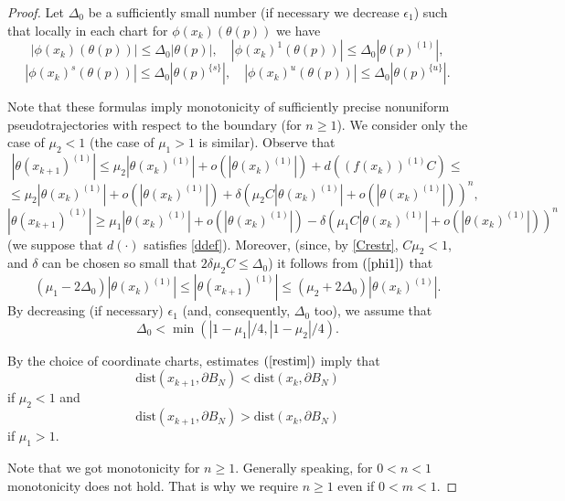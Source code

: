 \documentclass[11pt]{article}
\theoremstyle{Mystyle}
\begin{document}
\begin{proof}
Let $\Delta_0$ be a sufficiently small number (if necessary we decrease $\epsilon_1$) such that locally in each chart for $\phi(x_k)(\theta(p))$ we have
\begin{equation}
\label{phi1}
|\phi(x_k)(\theta(p))|\leq\Delta_0|\theta(p)|,\quad|\phi(x_k)^1(\theta(p))|\leq \Delta_0|\theta(p)^{(1)}|,%
\end{equation}
\begin{equation}
\label{phi2}
|\phi(x_k)^{s}(\theta(p))|\leq\Delta_0|\theta(p)^{\{s\}}|,\quad |\phi(x_k)^{u}(\theta(p))|\leq\Delta_0|\theta(p)^{\{u\}}|.
\end{equation}

Note that these formulas imply monotonicity of sufficiently precise nonuniform pseudotrajectories with respect to the boundary (for $n\geq 1$). We consider only the case of $\mu_2<1$ (the case of $\mu_1>1$ is similar).
Observe that 
$$|\theta(x_{k+1})^{(1)}|\leq \mu_2 |\theta(x_k)^{(1)}| + o(|\theta(x_k)^{(1)}|) + d((f(x_k))^{(1)}C) \leq$$ 
$$\leq\mu_2 |\theta(x_k)^{(1)}| + o(|\theta(x_k)^{(1)}|) + \delta(\mu_2 C |\theta(x_k)^{(1)}| + o(|\theta(x_k)^{(1)}|))^{n},$$
$$|\theta(x_{k+1})^{(1)}|\geq \mu_1 |\theta(x_k)^{(1)}| + o(|\theta(x_k)^{(1)}|) - \delta(\mu_1 C |\theta(x_k)^{(1)}| + o(|\theta(x_k)^{(1)}|))^{n}$$
(we suppose that $d(\cdot)$ satisfies \eqref{ddef}). 
Moreover, (since, by \eqref{Crestr}, $C\mu_2<1$, and $\delta$ can be chosen so small that $2\delta\mu_2 C\leq \Delta_0$) it follows from $(\ref{phi1})$ that
\begin{equation}
\label{restim}
(\mu_1-2\Delta_0) |\theta(x_k)^{(1)}| \leq |\theta(x_{k+1})^{(1)}| \leq (\mu_2+2\Delta_0) |\theta(x_k)^{(1)}|. 
\end{equation}
By decreasing (if necessary) $\epsilon_1$ (and, consequently, $\Delta_0$ too), we assume that $$\Delta_0 < \min(|1-\mu_1|/4,|1-\mu_2|/4).$$

By the choice of coordinate charts,
estimates $(\ref{restim})$ imply that
$$\mbox{dist}(x_{k+1},\partial B_N) < \mbox{dist}(x_k,\partial B_N)$$
if $\mu_2<1$ and  
$$\mbox{dist}(x_{k+1},\partial B_N) > \mbox{dist}(x_k,\partial B_N)$$
if $\mu_1>1$.

Note that we got monotonicity for $n\geq 1$.
Generally speaking, for $0<n<1$ monotonicity does not hold.
That is why we require $n\geq1$ even if $0<m<1$.


\end{proof}
\end{document}
